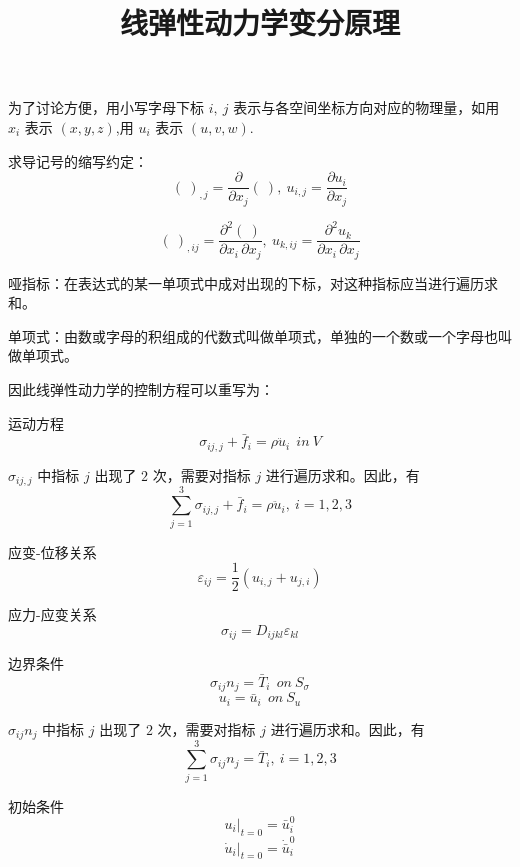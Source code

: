 \documentclass[12pt,a4paper]{article}
\title{线弹性动力学变分原理}
\date{\chntoday}
\begin{document}
\maketitle

为了讨论方便，用小写字母下标 $i,~j$ 表示与各空间坐标方向对应的物理量，如用 $x_i$ 表示 $(x, y, z)$,用 $u_i$ 表示 $(u, v, w)$.

求导记号的缩写约定：
$$(~)_{,j}=\frac{\partial}{\partial x_j}(~),~u_{i,j}=\frac{\partial u_i}{\partial x_j}$$

$$(~)_{,ij}=\frac{\partial^2 (~)}{\partial x_i\,\partial x_j},~u_{k,ij}=\frac{\partial^2 u_k}{\partial x_i\,\partial x_j}$$

哑指标：在表达式的某一单项式中成对出现的下标，对这种指标应当进行遍历求和。

单项式：由数或字母的积组成的代数式叫做单项式，单独的一个数或一个字母也叫做单项式。

因此线弹性动力学的控制方程可以重写为：

运动方程
\begin{equation}
\sigma_{ij,j}+\bar{f}_i=\rho\ddot{u}_i ~~in~V
\end{equation}

$\sigma_{ij,j}$ 中指标 $j$ 出现了 $2$ 次，需要对指标 $j$ 进行遍历求和。因此，有
$$
\sum_{j=1}^3 \sigma_{ij,j}+\bar{f}_i=\rho\ddot{u}_i , ~ i=1,2,3
$$

应变-位移关系
\begin{equation}
\varepsilon_{ij}=\frac{1}{2}(u_{i,j}+u_{j,i})
\end{equation}

应力-应变关系
\begin{equation}
\sigma_{ij}=D_{ijkl}\varepsilon_{kl}
\end{equation}

边界条件
\begin{equation}
\sigma_{ij}n_j=\bar{T}_i ~~on~S_{\sigma}
\end{equation}
\begin{equation}
u_i=\bar{u}_i ~~on~S_u 
\end{equation}

$\sigma_{ij}n_j$ 中指标 $j$ 出现了 $2$ 次，需要对指标 $j$ 进行遍历求和。因此，有
$$
\sum_{j=1}^3 \sigma_{ij}n_j=\bar{T}_i , ~ i=1,2,3
$$

初始条件
\begin{equation}
u_i|_{t=0}=\bar{u}^0_i
\end{equation}
\begin{equation}
\dot{u}_i|_{t=0}=\dot{\bar{u}}^0_i
\end{equation}
\end{document}
